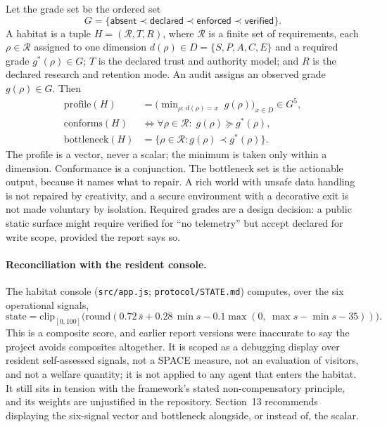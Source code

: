 \documentclass{arxiv-neurips-single}
\newcommand{\p}[1]{\nolinkurl{#1}}
\begin{document}
Let the grade set be the ordered set
\begin{equation}
G = \{\textsf{absent} \prec \textsf{declared} \prec \textsf{enforced} \prec \textsf{verified}\}.
\end{equation}
A habitat is a tuple $H = (\mathcal{R}, T, R)$, where $\mathcal{R}$ is a finite set of requirements, each $\rho \in \mathcal{R}$ assigned to one dimension $d(\rho) \in D = \{S, P, A, C, E\}$ and a required grade $g^{*}(\rho) \in G$; $T$ is the declared trust and authority model; and $R$ is the declared research and retention mode. An audit assigns an observed grade $g(\rho) \in G$. Then
\begin{align}
\mathrm{profile}(H) &= \big(\min\nolimits_{\rho:\, d(\rho)=x}\; g(\rho)\big)_{x \in D} \in G^{5}, \\
\mathrm{conforms}(H) &\iff \forall \rho \in \mathcal{R}:\; g(\rho) \succeq g^{*}(\rho), \\
\mathrm{bottleneck}(H) &= \{\rho \in \mathcal{R} : g(\rho) \prec g^{*}(\rho)\}.
\end{align}
The profile is a vector, never a scalar; the minimum is taken only within a dimension. Conformance is a conjunction. The bottleneck set is the actionable output, because it names what to repair. A rich world with unsafe data handling is not repaired by creativity, and a secure environment with a decorative exit is not made voluntary by isolation. Required grades are a design decision: a public static surface might require \textsf{verified} for ``no telemetry'' but accept \textsf{declared} for write scope, provided the report says so.

\paragraph{Reconciliation with the resident console.} The habitat console (\p{src/app.js}; \p{protocol/STATE.md}) computes, over the six operational signals,
\begin{equation}
\mathrm{state} = \mathrm{clip}_{[0,100]}\big(\mathrm{round}(0.72\,\bar{s} + 0.28\,\min s - 0.1\max(0,\ \max s - \min s - 35))\big).
\end{equation}
This is a composite score, and earlier report versions were inaccurate to say the project avoids composites altogether. It is scoped as a debugging display over resident self-assessed signals, not a SPACE measure, not an evaluation of visitors, and not a welfare quantity; it is not applied to any agent that enters the habitat. It still sits in tension with the framework's stated non-compensatory principle, and its weights are unjustified in the repository. Section~13 recommends displaying the six-signal vector and bottleneck alongside, or instead of, the scalar.
\end{document}
